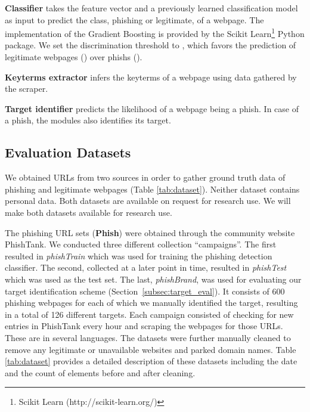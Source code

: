 \documentclass[10pt,conference,compsocconf,letterpaper]{IEEEtran}
\begin{document}
\noindent\textbf{Classifier} takes the feature vector and a previously learned classification model as input to predict the class, phishing or legitimate, of a webpage. The implementation of the Gradient Boosting is provided by the Scikit Learn\footnote{Scikit Learn (http://scikit-learn.org/)} Python package. 
\iffeateval
We set the discrimination threshold to , which favors the prediction of legitimate webpages () over phishs ().
\fi

\noindent\textbf{Keyterms extractor} infers the keyterms of a webpage using data gathered by the scraper.

\noindent\textbf{Target identifier} predicts the likelihood of a webpage being a phish. In case of a phish, the modules also identifies its target.

\subsection{Evaluation Datasets}

We obtained URLs from two sources in order to gather ground truth data of phishing and legitimate webpages (Table \ref{tab:dataset}). 
Neither dataset contains personal data. 
\iffullversion
Both datasets are available on request for research use.
\else
We will make both datasets available for research use.
\fi


The phishing URL sets (\textbf{Phish}) were obtained through the community website PhishTank. We conducted three different collection ``campaigns''. The first resulted in \textit{phishTrain} which was used for training the phishing detection classifier. The second, collected at a later point in time, resulted in \textit{phishTest} which was used as the test set. The last, \textit{phishBrand}, was used for evaluating our target identification scheme (Section~\ref{subsec:target_eval}). It consists of 600 phishing webpages for each of which we manually identified the target, resulting in a total of 126 different targets. Each campaign consisted of checking for new entries in PhishTank every hour and scraping the webpages for those URLs.
These are in several languages. The datasets were further manually cleaned to remove any legitimate or unavailable websites and parked domain names. Table \ref{tab:dataset} provides a detailed description of these datasets including the date and the count of elements before and after cleaning.
\end{document}
